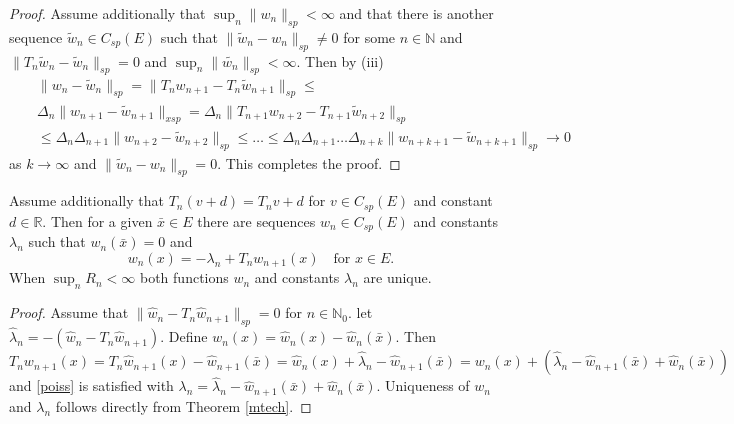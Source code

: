 \documentclass[10pt,english]{extarticle}
\begin{document}
\begin{proof}
Assume additionally that $\sup_n \|w_n\|_{sp}<\infty$ and that there is another sequence $\tilde{w}_n\in C_{sp}(E)$ such that $\|\tilde{w}_n-w_n\|_{sp} \neq 0$ for some $n\in \mathbb{N}$ and $\|T_n\tilde{w}_n-\tilde{w}_n\|_{sp}=0$ and $\sup_n \|\tilde{w_n}\|_{sp}<\infty$. Then by (iii)
\begin{eqnarray}
&& \|w_n-\tilde{w}_n\|_{sp}=\|T_nw_{n+1}-T_n\tilde{w}_{n+1}\|_{sp}\leq\nonumber \\
&& \Delta_n \|w_{n+1}-\tilde{w}_{n+1}\|_{x
sp} = \Delta_n \|T_{n+1}w_{n+2}-T_{n+1}\tilde{w}_{n+2}\|_{sp} \nonumber \\
&&\leq\Delta_n \Delta_{n+1} \|w_{n+2}-\tilde{w}_{n+2}\|_{sp} \leq \ldots \leq \Delta_n \Delta_{n+1} \ldots  \Delta_{n+k} \|w_{n+k+1}-\tilde{w}_{n+k+1}\|_{sp}\to 0
\end{eqnarray}
as $k\to \infty$ and $\|\tilde{w}_n-w_n\|_{sp} = 0$.
This completes the proof.
\end{proof}
\begin{corollary}\label{exist}
Assume additionally that $T_n(v+d)=T_nv+d$ for $v\in C_{sp}(E)$ and constant $d\in \mathbb{R}$. Then for a given $\bar{x}\in E$ there are sequences $w_n\in C_{sp}(E)$ and constants $\lambda_n$ such that $w_n(\bar{x})=0$ and
\begin{equation}\label{poiss}
w_n(x) = -\lambda_n + T_nw_{n+1}(x) \quad \mbox{for $x\in E$}.
\end{equation}
When $\sup_n R_n <\infty$ both functions $w_n$ and constants $\lambda_n$ are unique.
\end{corollary}
\begin{proof} Assume that $\|\hat{w}_n-T_n\hat{w}_{n+1}\|_{sp}=0$ for $n\in \mathbb{N}_0$. let
$\hat{\lambda}_n=-(\hat{w}_n-T_n\hat{w}_{n+1})$. Define $w_n(x)=\hat{w}_n(x)-\hat{w}_n(\bar{x})$.
Then
\begin{equation}
T_nw_{n+1}(x)=T_n\hat{w}_{n+1}(x)-\hat{w}_{n+1}(\bar{x})=  \hat{w}_n(x)+\hat{\lambda}_n-\hat{w}_{n+1}(\bar{x}) =  w_n(x) + (\hat{\lambda}_n - \hat{w}_{n+1}(\bar{x})+\hat{w}_n(\bar{x}))
\end{equation}
and \eqref{poiss} is satisfied with $\lambda_n=\hat{\lambda}_n - \hat{w}_{n+1}(\bar{x})+\hat{w}_n(\bar{x})$.
Uniqueness of $w_n$ and $\lambda_n$ follows directly from Theorem \ref{mtech}.
\end{proof}
\end{document}
